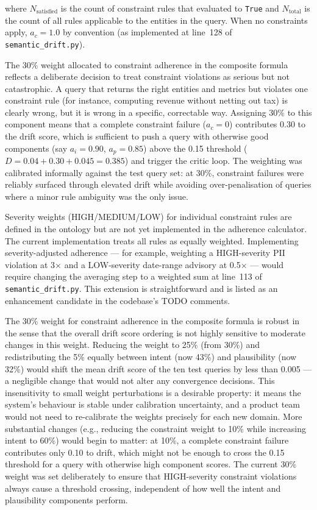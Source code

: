 \documentclass[12pt,a4paper]{report}
\begin{document}
where $N_{\text{satisfied}}$ is the count of constraint rules that evaluated to \texttt{True} and $N_{\text{total}}$ is the count of all rules applicable to the entities in the query. When no constraints apply, $a_c = 1.0$ by convention (as implemented at line~128 of \texttt{semantic\_drift.py}).

The 30\% weight allocated to constraint adherence in the composite formula reflects a deliberate decision to treat constraint violations as serious but not catastrophic. A query that returns the right entities and metrics but violates one constraint rule (for instance, computing revenue without netting out tax) is clearly wrong, but it is wrong in a specific, correctable way. Assigning 30\% to this component means that a complete constraint failure ($a_c = 0$) contributes 0.30 to the drift score, which is sufficient to push a query with otherwise good components (say $a_i = 0.90$, $a_p = 0.85$) above the 0.15 threshold ($D = 0.04 + 0.30 + 0.045 = 0.385$) and trigger the critic loop. The weighting was calibrated informally against the test query set: at 30\%, constraint failures were reliably surfaced through elevated drift while avoiding over-penalisation of queries where a minor rule ambiguity was the only issue.

Severity weights (HIGH/MEDIUM/LOW) for individual constraint rules are defined in the ontology but are not yet implemented in the adherence calculator. The current implementation treats all rules as equally weighted. Implementing severity-adjusted adherence — for example, weighting a HIGH-severity PII violation at 3$\times$ and a LOW-severity date-range advisory at 0.5$\times$ — would require changing the averaging step to a weighted sum at line~113 of \texttt{semantic\_drift.py}. This extension is straightforward and is listed as an enhancement candidate in the codebase's TODO comments.

The 30\% weight for constraint adherence in the composite formula is robust in the sense that the overall drift score ordering is not highly sensitive to moderate changes in this weight. Reducing the weight to 25\% (from 30\%) and redistributing the 5\% equally between intent (now 43\%) and plausibility (now 32\%) would shift the mean drift score of the ten test queries by less than 0.005 — a negligible change that would not alter any convergence decisions. This insensitivity to small weight perturbations is a desirable property: it means the system's behaviour is stable under calibration uncertainty, and a product team would not need to re-calibrate the weights precisely for each new domain. More substantial changes (e.g., reducing the constraint weight to 10\% while increasing intent to 60\%) would begin to matter: at 10\%, a complete constraint failure contributes only 0.10 to drift, which might not be enough to cross the 0.15 threshold for a query with otherwise high component scores. The current 30\% weight was set deliberately to ensure that HIGH-severity constraint violations always cause a threshold crossing, independent of how well the intent and plausibility components perform.
\end{document}
